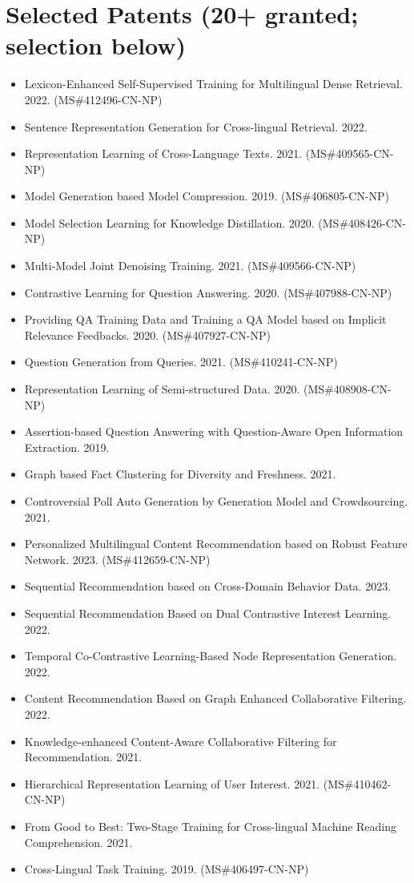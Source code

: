 \documentclass[10.5pt,letterpaper]{article}
\begin{document}
\section*{Selected Patents (20+ granted; selection below)}
\begin{itemize}[leftmargin=1.1em, itemsep=0pt, topsep=1pt, parsep=0pt]
  \item Lexicon-Enhanced Self-Supervised Training for Multilingual Dense Retrieval. 2022. (MS\#412496-CN-NP)
  \item Sentence Representation Generation for Cross-lingual Retrieval. 2022.
  \item Representation Learning of Cross-Language Texts. 2021. (MS\#409565-CN-NP)
  \item Model Generation based Model Compression. 2019. (MS\#406805-CN-NP)
  \item Model Selection Learning for Knowledge Distillation. 2020. (MS\#408426-CN-NP)
  \item Multi-Model Joint Denoising Training. 2021. (MS\#409566-CN-NP)
  \item Contrastive Learning for Question Answering. 2020. (MS\#407988-CN-NP)
  \item Providing QA Training Data and Training a QA Model based on Implicit Relevance Feedbacks. 2020. (MS\#407927-CN-NP)
  \item Question Generation from Queries. 2021. (MS\#410241-CN-NP)
  \item Representation Learning of Semi-structured Data. 2020. (MS\#408908-CN-NP)
  \item Assertion-based Question Answering with Question-Aware Open Information Extraction. 2019.
  \item Graph based Fact Clustering for Diversity and Freshness. 2021.
  \item Controversial Poll Auto Generation by Generation Model and Crowdsourcing. 2021.
  \item Personalized Multilingual Content Recommendation based on Robust Feature Network. 2023. (MS\#412659-CN-NP)
  \item Sequential Recommendation based on Cross-Domain Behavior Data. 2023.
  \item Sequential Recommendation Based on Dual Contrastive Interest Learning. 2022.
  \item Temporal Co-Contrastive Learning-Based Node Representation Generation. 2022.
  \item Content Recommendation Based on Graph Enhanced Collaborative Filtering. 2022.
  \item Knowledge-enhanced Content-Aware Collaborative Filtering for Recommendation. 2021.
  \item Hierarchical Representation Learning of User Interest. 2021. (MS\#410462-CN-NP)
  \item From Good to Best: Two-Stage Training for Cross-lingual Machine Reading Comprehension. 2021.
  \item Cross-Lingual Task Training. 2019. (MS\#406497-CN-NP)
\end{itemize}
\end{document}
